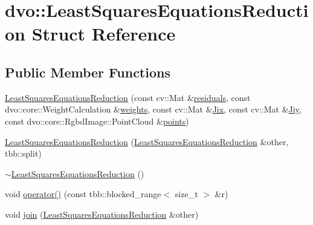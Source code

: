 \hypertarget{structdvo_1_1_least_squares_equations_reduction}{}\section{dvo\+:\+:Least\+Squares\+Equations\+Reduction Struct Reference}
\label{structdvo_1_1_least_squares_equations_reduction}
\subsection*{Public Member Functions}
\begin{DoxyCompactItemize}
\item 
\mbox{\hyperlink{structdvo_1_1_least_squares_equations_reduction_ae69114a4911fd35ce60a4696d15ce5a1}{Least\+Squares\+Equations\+Reduction}} (const cv\+::\+Mat \&\mbox{\hyperlink{structdvo_1_1_least_squares_equations_reduction_a6140e6f4c600016951877b7f79efeec1}{residuals}}, const dvo\+::core\+::\+Weight\+Calculation \&\mbox{\hyperlink{structdvo_1_1_least_squares_equations_reduction_a135763297b1e3bcee21189e0f5014fe4}{weights}}, const cv\+::\+Mat \&\mbox{\hyperlink{structdvo_1_1_least_squares_equations_reduction_a513436c876416261efe1d99188f8117a}{Jix}}, const cv\+::\+Mat \&\mbox{\hyperlink{structdvo_1_1_least_squares_equations_reduction_a7d8b6e08f0baf9580e0d5eb00776911f}{Jiy}}, const dvo\+::core\+::\+Rgbd\+Image\+::\+Point\+Cloud \&\mbox{\hyperlink{structdvo_1_1_least_squares_equations_reduction_a31ca8e056a271c3f3c99140e679a55c1}{points}})
\item 
\mbox{\hyperlink{structdvo_1_1_least_squares_equations_reduction_a0d615509ae3ef7176e8f9504065de1b0}{Least\+Squares\+Equations\+Reduction}} (\mbox{\hyperlink{structdvo_1_1_least_squares_equations_reduction}{Least\+Squares\+Equations\+Reduction}} \&other, tbb\+::split)
\item 
\mbox{\hyperlink{structdvo_1_1_least_squares_equations_reduction_aebf5509fd667020911a060bb93df51c2}{$\sim$\+Least\+Squares\+Equations\+Reduction}} ()
\item 
void \mbox{\hyperlink{structdvo_1_1_least_squares_equations_reduction_a4730c4255382ba919c088e70cbea9d44}{operator()}} (const tbb\+::blocked\+\_\+range$<$ size\+\_\+t $>$ \&r)
\item 
void \mbox{\hyperlink{structdvo_1_1_least_squares_equations_reduction_a35553c6631e0ff25089aea292619bf6b}{join}} (\mbox{\hyperlink{structdvo_1_1_least_squares_equations_reduction}{Least\+Squares\+Equations\+Reduction}} \&other)
\end{DoxyCompactItemize}
